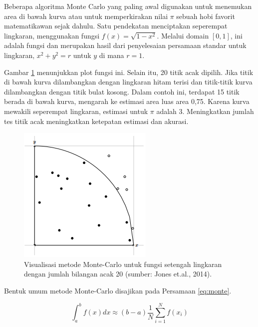 \documentclass[]{book}
\theoremstyle{definition}
\theoremstyle{definition}
\theoremstyle{definition}
\theoremstyle{remark}
\begin{document}
Beberapa algoritma Monte Carlo yang paling awal digunakan untuk menemukan area di bawah kurva atau untuk memperkirakan nilai \(\pi\) sebuah hobi favorit matematikawan sejak dahulu. Satu pendekatan menciptakan seperempat lingkaran, menggunakan fungsi \(f \left(x\right) = \sqrt{1-x^2}\). Melalui domain \(\left[0, 1\right]\), ini adalah fungsi dan merupakan hasil dari penyelesaian persamaan standar untuk lingkaran, \(x^2 + y^2 = r\) untuk \(y\) di mana \(r = 1\).

Gambar \ref{fig:monteviz} menunjukkan plot fungsi ini. Selain itu, 20 titik acak dipilih. Jika titik di bawah kurva dilambangkan dengan lingkaran hitam terisi dan titik-titik kurva dilambangkan dengan titik bulat kosong. Dalam contoh ini, terdapat 15 titik berada di bawah kurva, mengarah ke estimasi area luas area 0,75. Karena kurva mewakili seperempat lingkaran, estimasi untuk \(\pi\) adalah 3. Meningkatkan jumlah tes titik acak meningkatkan ketepatan estimasi dan akurasi.

\begin{figure}

{\centering \includegraphics[width=0.7\linewidth]{./images/monte} 

}

\caption{Visualisasi metode Monte-Carlo untuk fungsi setengah lingkaran dengan jumlah bilangan acak 20 (sumber: Jones et.al., 2014).}\label{fig:monteviz}
\end{figure}

Bentuk umum metode Monte-Carlo disajikan pada Persamaan \eqref{eq:monte}.

\begin{equation}
\int_a^bf\left(x\right)dx\approx\left(b-a\right)\frac{1}{N}\sum_{i=1}^Nf\left(x_i\right)
  \label{eq:monte}
\end{equation}
\end{document}
